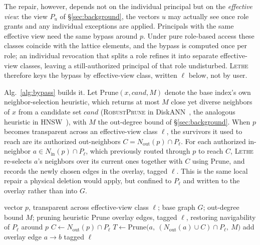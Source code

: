 \documentclass[sigconf, nonacm, review]{acmart}
\newcommand{\Nout}{N_{\mathrm{out}}}
\newcommand{\Nin}{N_{\mathrm{in}}}
\begin{document}
The repair, however, depends not on the individual principal but on the
\emph{effective view}: the view $P_u$ of \S\ref{sec:background}, the vectors $u$ may actually see once
role grants and any individual exceptions are applied. Principals with the
same effective view need the same bypass around $p$. Under pure role-based
access these classes coincide with the lattice elements, and the bypass is
computed once per role; an individual revocation that splits a role refines
it into separate effective-view classes, leaving a still-authorized principal
of that role undisturbed. \textsc{Lethe} therefore keys the bypass by effective-view
class, written $\ell$ below, not by user.

Alg.~\ref{alg:bypass} builds it. Let $\mathrm{Prune}(x,\mathit{cand},M)$
denote the base index's own neighbor-selection heuristic, which returns at
most $M$ close yet diverse neighbors of $x$ from a candidate set
$\mathit{cand}$ (\textsc{RobustPrune} in
DiskANN~\cite{DBLP:conf/nips/SubramanyaDSKK19}, the analogous heuristic in
HNSW~\cite{DBLP:journals/pami/MalkovY20}), with $M$ the out-degree bound of
\S\ref{sec:background}. When $p$ becomes transparent across an effective-view class
$\ell$, the survivors it used to reach are its authorized out-neighbors
$C=\Nout(p)\cap P_\ell$. For each authorized in-neighbor
$a\in\Nin(p)\cap P_\ell$, which previously routed through $p$ to reach $C$,
\textsc{Lethe} re-selects $a$'s neighbors over its current ones together with $C$
using $\mathrm{Prune}$, and records the newly chosen edges in the overlay,
tagged $\ell$. This is the same local repair a physical deletion would
apply, but confined to $P_\ell$ and written to the overlay rather than into
$G$.

\begin{algorithm}
\caption{Bypass construction for a transparent vector}
\label{alg:bypass}
\begin{algorithmic}[1]
\Require vector $p$, transparent across effective-view class $\ell$; base graph $G$;
out-degree bound $M$; pruning heuristic $\mathrm{Prune}$
\Ensure overlay edges, tagged $\ell$, restoring navigability of $P_\ell$ around $p$
\State $C \gets \Nout(p)\cap P_\ell$ 
\For{each $a \in \Nin(p)\cap P_\ell$} 
  \State $T \gets \mathrm{Prune}\big(a,\ (\Nout(a)\cup C)\cap P_\ell,\ M\big)$
  \For{each $b \in T\setminus \Nout(a)$}
    \State add overlay edge $a\!\rightarrow\! b$ tagged $\ell$
  \EndFor
\EndFor
\end{algorithmic}
\end{algorithm}
\end{document}
